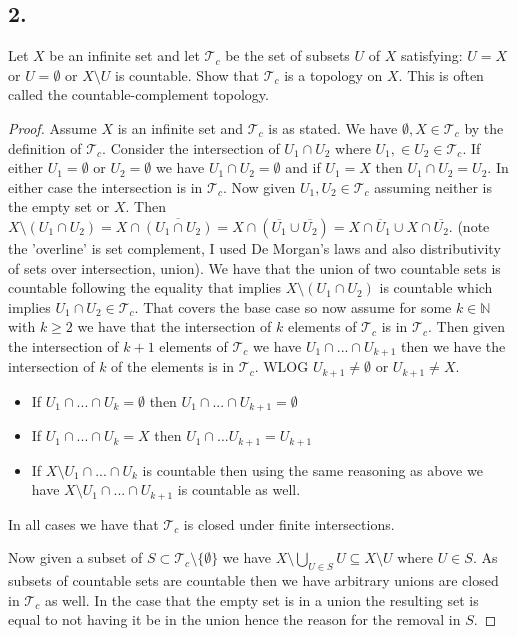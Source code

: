 \documentclass{amsart}
\theoremstyle{plain}
\theoremstyle{definition}
\theoremstyle{remark}
\begin{document}
\vspace{.15in}




\noindent
\subsection*{2.} Let $X$ be an infinite set and let $\mathcal T _c$ be the set of subsets $U$ of $X$ satisfying: $U=X$ or $U=\emptyset$ or $X\setminus U$ is countable. Show that $\mathcal T _c$ is a topology on $X$. This is often called the countable-complement topology.

\begin{proof}
    Assume $X$ is an infinite set and $\mathcal T _ c$ is as stated. We have $\emptyset,X\in \mathcal T _c$ by the definition of $\mathcal T _c$. Consider the intersection of $U_1\cap U_2$ where $U_1,\in U_2 \in \mathcal T_c$. If either $U_1=\emptyset$ or $U_2=\emptyset$ we have $U_1\cap U_2=\emptyset$ and if $U_1=X$ then $U_1\cap U_2=U_2$. In either case the intersection is in $\mathcal T_c$. Now given $U_1,U_2\in \mathcal T_c$ assuming neither is the empty set or $X$. Then $X\setminus (U_1\cap U_2)=X\cap \overline{(U_1\cap U_2)}=X\cap(\overline{U_1}\cup \overline{U_2})=X\cap\overline U_1 \cup X\cap \overline {U_2}$. (note the 'overline' is set complement, I used De Morgan's laws and also distributivity of sets over intersection,  union). We have that the union of two countable sets is countable following the equality that implies $X\setminus (U_1\cap U_2)$ is countable which implies $U_1\cap U_2\in \mathcal T_c$. That covers the base case so now assume for some $k\in \mathbb{N}$ with $k\geq 2$ we have that the intersection of $k$ elements of $\mathcal T_c$ is in $\mathcal T_c$. Then given the intersection of $k+1$ elements of $\mathcal T_c$ we have $U_1\cap ... \cap U_{k+1}$ then we have the intersection of $k$ of the elements is in $\mathcal T_c$. WLOG $U_{k+1}\not =\emptyset$ or $U_{k+1}\not = X$.
    \begin{itemize}
        \item If $U_1\cap ...\cap U_k=\emptyset$ then $U_1\cap ...\cap U_{k+1}=\emptyset$
        \item If $U_1\cap ... \cap U_{k}=X$ then $U_1\cap ... U_{k+1}=U_{k+1}$
        \item If $X\setminus{U_1\cap ... \cap U_{k}}$ is countable then using the same reasoning as above we have $X\setminus{U_1\cap...\cap U_{k+1}}$ is countable as well.
    \end{itemize}
    In all cases we have that $\mathcal T_c$ is closed under finite intersections. 

    Now given a subset of $S\subset \mathcal T_c\setminus \{\emptyset\}$ we have $X\setminus \bigcup_{U\in S}U\subseteq X\setminus U$ where $U\in S$. As subsets of countable sets are countable then we have arbitrary unions are closed in $\mathcal {T}_c$ as well. In the case that the empty set is in a union the resulting set is equal to not having it be in the union hence the reason for the removal in $S$.


\end{proof}
\end{document}
